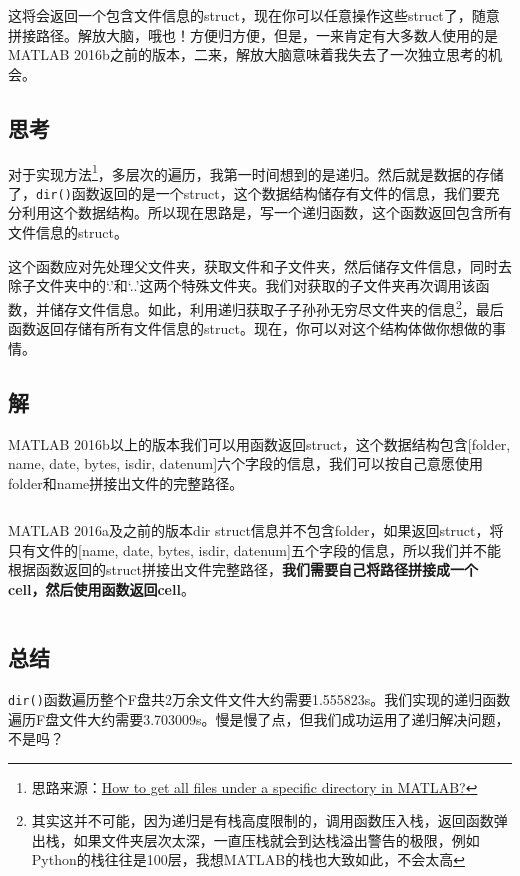 这将会返回一个包含文件信息的struct，现在你可以任意操作这些struct了，随意拼接路径。解放大脑，哦也！方便归方便，但是，一来肯定有大多数人使用的是MATLAB 2016b之前的版本，二来，解放大脑意味着我失去了一次独立思考的机会。

\subsection*{思考}

对于实现方法\footnote{思路来源：\href{https://stackoverflow.com/questions/2652630/how-to-get-all-files-under-a-specific-directory-in-matlab}{How to get all files under a specific directory in MATLAB?}}，多层次的遍历，我第一时间想到的是递归。然后就是数据的存储了，\texttt{dir()}函数返回的是一个struct，这个数据结构储存有文件的信息，我们要充分利用这个数据结构。所以现在思路是，写一个递归函数，这个函数返回包含所有文件信息的struct。

这个函数应对先处理父文件夹，获取文件和子文件夹，然后储存文件信息，同时去除子文件夹中的`.'和`..'这两个特殊文件夹。我们对获取的子文件夹再次调用该函数，并储存文件信息。如此，利用递归获取子子孙孙无穷尽文件夹的信息\footnote{其实这并不可能，因为递归是有栈高度限制的，调用函数压入栈，返回函数弹出栈，如果文件夹层次太深，一直压栈就会到达栈溢出警告的极限，例如Python的栈往往是100层，我想MATLAB的栈也大致如此，不会太高}，最后函数返回存储有所有文件信息的struct。现在，你可以对这个结构体做你想做的事情。

\subsection*{解}

MATLAB 2016b以上的版本我们可以用函数返回struct，这个数据结构包含[folder, name, date, bytes, isdir, datenum]六个字段的信息，我们可以按自己意愿使用folder和name拼接出文件的完整路径。

\inputminted[firstline=1]{Matlab}{code/matlab/get_all_file_name_R2016b_newer.m}

MATLAB 2016a及之前的版本dir struct信息并不包含folder，如果返回struct，将只有文件的[name, date, bytes, isdir, datenum]五个字段的信息，所以我们并不能根据函数返回的struct拼接出文件完整路径，\textbf{我们需要自己将路径拼接成一个cell，然后使用函数返回cell}。

\inputminted{Matlab}{code/matlab/get_all_file_name_R2016a_older.m}

\subsection*{总结}
\texttt{dir()}函数遍历整个F盘共2万余文件文件大约需要1.555823s。我们实现的递归函数遍历F盘文件大约需要3.703009s。慢是慢了点，但我们成功运用了递归解决问题，不是吗？

